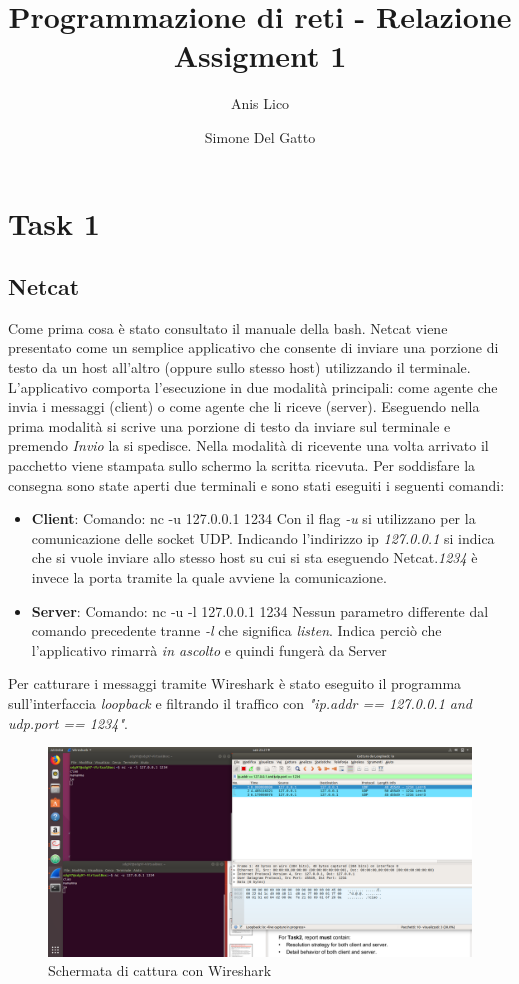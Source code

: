 \documentclass[a4paper]{article}
\author{Anis Lico \and Simone Del Gatto}
\title{Programmazione di reti - Relazione Assigment 1}
\begin{document}
\maketitle
\tableofcontents

\section{Task 1}
\subsection{Netcat}
Come prima cosa è stato consultato il manuale della bash. Netcat viene presentato come un semplice applicativo che consente di inviare una porzione di testo da un host all'altro (oppure sullo stesso host) utilizzando il terminale. L'applicativo comporta l'esecuzione in due modalità principali: come agente che invia i messaggi (client) o come agente che li riceve (server). Eseguendo nella prima modalità si scrive una porzione di testo da inviare sul terminale e premendo \emph{Invio} la si spedisce. Nella modalità di ricevente una volta arrivato il pacchetto viene stampata sullo schermo la scritta ricevuta. 
Per soddisfare la consegna sono state aperti due terminali e sono stati eseguiti i seguenti comandi:
\begin{itemize}
\item \textbf{Client}: \newline
Comando: nc -u 127.0.0.1 1234
Con il flag \emph{-u} si utilizzano per la comunicazione delle socket UDP. Indicando l'indirizzo ip \emph{127.0.0.1} si indica che si vuole inviare allo stesso host su cui si sta eseguendo Netcat.\emph{1234} è invece la porta tramite la quale avviene la comunicazione.
\item \textbf{Server}: \newline
Comando: nc -u -l 127.0.0.1 1234
Nessun parametro differente dal comando precedente tranne \emph{-l} che significa \emph{listen}. Indica perciò che l'applicativo rimarrà \emph{in ascolto} e quindi fungerà da Server
\end{itemize}
Per catturare i messaggi tramite Wireshark è stato eseguito il programma sull'interfaccia \emph{loopback} e filtrando il traffico con \emph{"ip.addr == 127.0.0.1 and udp.port == 1234"}.
\begin{figure}[ht!]
\includegraphics[scale = 0.20]{wireshark.png}
\caption{Schermata di cattura con Wireshark}
\end{figure}
\end{document}
